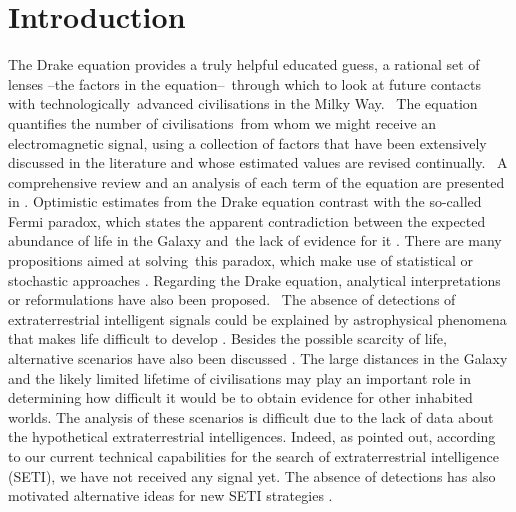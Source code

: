 \documentclass[crop]{CSLB}
\begin{document}
\maketitle


\section{Introduction}\label{S_motivations}

The Drake equation  \citep{drake_intelligent_1962} provides a truly
helpful educated guess, a rational set of lenses --the factors in the
equation-- through which to look at future contacts with
technologically advanced civilisations in the Milky Way. 
%
The equation quantifies the number of civilisations from whom we might
receive an electromagnetic signal, using a collection of factors that
have been extensively discussed in the literature and whose estimated
values are revised continually. 
%
A comprehensive review and an analysis of each term of the equation
are presented in \citet{vakoch_drake_2015}.
%
Optimistic estimates from the Drake equation contrast with the
so-called Fermi paradox, which states the apparent contradiction
between the expected abundance of life in the Galaxy and the lack of
evidence for it \citep[e.g. ][]{hart_explanation_1975,
brin_great_1983, barlow_galactic_2012, forgan_galactic_2017,
anchordoqui_is_2017, Sotos_biotechnology_2019,
carroll_nellemback_fermi_2019}.
%
There are many propositions aimed at solving this paradox, which make
use of statistical \citep{solomonides_probabilistic_2016,
horvat_calculating_2007, maccone_statistical_2015} or stochastic
approaches \citep{forgan_numerical_2009, bloetscher_using_2019,
glade_stochastic_2011, forgan_numerical_2010}.
%
Regarding the Drake equation, analytical interpretations
\citep{prantzos_joint_2013, smith_broadcasting_2009} or reformulations
\citep[][and references therein]{burchell_whither_2006} have also been
proposed. 
%
The absence of detections of extraterrestrial intelligent signals
could be explained by astrophysical phenomena that makes life
difficult to develop \citep{annis_astrophysical_1999}.
%
Besides the possible scarcity of life, alternative scenarios have also
been discussed \citep{barlow_galactic_2013, lampton_information_2013,
conway_three_2018, forgan_galactic_2017}.
%
The large distances in the Galaxy and the likely limited lifetime of
civilisations may play an important role in determining how difficult
it would be to obtain evidence for other inhabited worlds.
%
The analysis of these scenarios is difficult due to the lack of data
about the hypothetical extraterrestrial intelligences.
%
Indeed, as \citet{tarter_search_2001} pointed out, according to our
current technical capabilities for the search of extraterrestrial
intelligence (SETI), we have not received any signal yet.
%
The absence of detections has also motivated alternative ideas for new
SETI strategies \citep{forgan_exoplanet_2019, balbi_impact_2018,
loeb_eavesdropping_2006, maccone_KLT_2010, tarter_advancing_2009,
enriquez_breakthrough_2017, loeb_relative_2016, maccone_SETI_2011,
lingam_relative_2019, wright_theGsearch_2015, maccone_SETI_2013,
maccone_lognormals_2014, harp_application_2018,
forgan_possibility_2013, forgan_galactic_2017, funes_searching_2019}.
\end{document}
